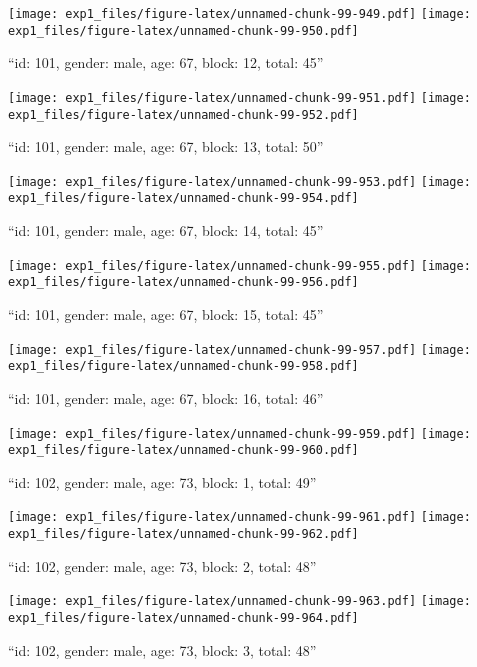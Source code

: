\documentclass[,]{article}
\begin{document}
\texttt{[image: exp1\_files/figure-latex/unnamed-chunk-99-949.pdf]}
\texttt{[image: exp1\_files/figure-latex/unnamed-chunk-99-950.pdf]}

\newpage
[1] 

``id: 101, gender: male, age: 67, block: 12, total: 45''

\texttt{[image: exp1\_files/figure-latex/unnamed-chunk-99-951.pdf]}
\texttt{[image: exp1\_files/figure-latex/unnamed-chunk-99-952.pdf]}

\newpage
[1] 

``id: 101, gender: male, age: 67, block: 13, total: 50''

\texttt{[image: exp1\_files/figure-latex/unnamed-chunk-99-953.pdf]}
\texttt{[image: exp1\_files/figure-latex/unnamed-chunk-99-954.pdf]}

\newpage
[1] 

``id: 101, gender: male, age: 67, block: 14, total: 45''

\texttt{[image: exp1\_files/figure-latex/unnamed-chunk-99-955.pdf]}
\texttt{[image: exp1\_files/figure-latex/unnamed-chunk-99-956.pdf]}

\newpage
[1] 

``id: 101, gender: male, age: 67, block: 15, total: 45''

\texttt{[image: exp1\_files/figure-latex/unnamed-chunk-99-957.pdf]}
\texttt{[image: exp1\_files/figure-latex/unnamed-chunk-99-958.pdf]}

\newpage
[1] 

``id: 101, gender: male, age: 67, block: 16, total: 46''

\texttt{[image: exp1\_files/figure-latex/unnamed-chunk-99-959.pdf]}
\texttt{[image: exp1\_files/figure-latex/unnamed-chunk-99-960.pdf]}

\newpage
[1] 

``id: 102, gender: male, age: 73, block: 1, total: 49''

\texttt{[image: exp1\_files/figure-latex/unnamed-chunk-99-961.pdf]}
\texttt{[image: exp1\_files/figure-latex/unnamed-chunk-99-962.pdf]}

\newpage
[1] 

``id: 102, gender: male, age: 73, block: 2, total: 48''

\texttt{[image: exp1\_files/figure-latex/unnamed-chunk-99-963.pdf]}
\texttt{[image: exp1\_files/figure-latex/unnamed-chunk-99-964.pdf]}

\newpage
[1] 

``id: 102, gender: male, age: 73, block: 3, total: 48''
\end{document}

